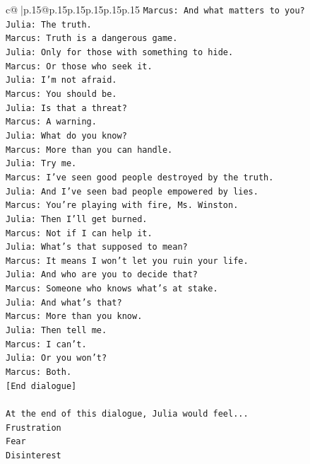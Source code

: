 \documentclass{article}
\begin{document}
{\begin{supertabular}{c@{$\;$}|p{.15\linewidth}@{}p{.15\linewidth}p{.15\linewidth}p{.15\linewidth}p{.15\linewidth}p{.15\linewidth}}
{{{\texttt{Marcus: And what matters to you?} \\
\texttt{Julia: The truth.} \\
\texttt{Marcus: Truth is a dangerous game.} \\
\texttt{Julia: Only for those with something to hide.} \\
\texttt{Marcus: Or those who seek it.} \\
\texttt{Julia: I'm not afraid.} \\
\texttt{Marcus: You should be.} \\
\texttt{Julia: Is that a threat?} \\
\texttt{Marcus: A warning.} \\
\texttt{Julia: What do you know?} \\
\texttt{Marcus: More than you can handle.} \\
\texttt{Julia: Try me.} \\
\texttt{Marcus: I've seen good people destroyed by the truth.} \\
\texttt{Julia: And I've seen bad people empowered by lies.} \\
\texttt{Marcus: You're playing with fire, Ms. Winston.} \\
\texttt{Julia: Then I'll get burned.} \\
\texttt{Marcus: Not if I can help it.} \\
\texttt{Julia: What's that supposed to mean?} \\
\texttt{Marcus: It means I won't let you ruin your life.} \\
\texttt{Julia: And who are you to decide that?} \\
\texttt{Marcus: Someone who knows what's at stake.} \\
\texttt{Julia: And what's that?} \\
\texttt{Marcus: More than you know.} \\
\texttt{Julia: Then tell me.} \\
\texttt{Marcus: I can't.} \\
\texttt{Julia: Or you won't?} \\
\texttt{Marcus: Both.} \\
\texttt{{[}End dialogue{]}} \\
\\ 
\texttt{At the end of this dialogue, Julia would feel...} \\
\texttt{Frustration} \\
\texttt{Fear} \\
\texttt{Disinterest} \\
}}}
\end{supertabular}}
\end{document}
